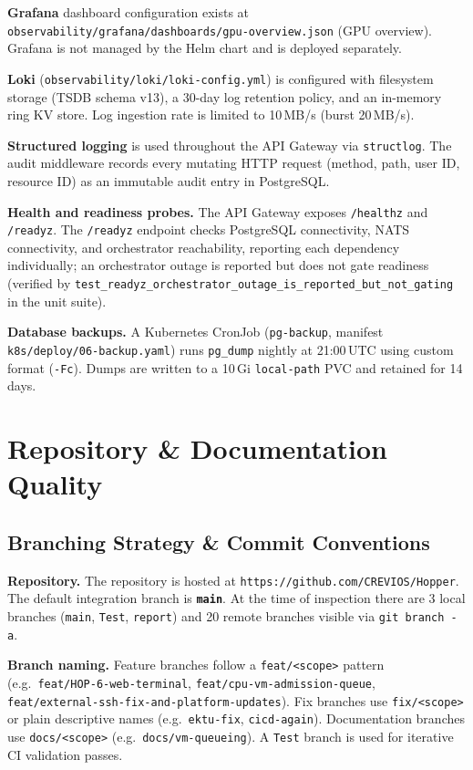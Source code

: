 \documentclass[12pt,a4paper]{article}
\begin{document}
\medskip
\noindent\textbf{Grafana} dashboard configuration exists at
\texttt{observability/grafana/dashboards/gpu-overview.json} (GPU overview).
Grafana is not managed by the Helm chart and is deployed separately.

\medskip
\noindent\textbf{Loki} (\texttt{observability/loki/loki-config.yml})
is configured with filesystem storage (TSDB schema v13), a 30-day log
retention policy, and an in-memory ring KV store.
Log ingestion rate is limited to 10\,MB/s (burst 20\,MB/s).

\medskip
\noindent\textbf{Structured logging} is used throughout the API Gateway
via \texttt{structlog}. The audit middleware records every mutating
HTTP request (method, path, user ID, resource ID) as an immutable audit
entry in PostgreSQL.

\medskip
\noindent\textbf{Health and readiness probes.}
The API Gateway exposes \texttt{/healthz} and \texttt{/readyz}.
The \texttt{/readyz} endpoint checks PostgreSQL connectivity, NATS
connectivity, and orchestrator reachability, reporting each dependency
individually; an orchestrator outage is reported but does not gate
readiness (verified by \texttt{test\_readyz\_orchestrator\_outage\_is\_reported\_but\_not\_gating}
in the unit suite).

\medskip
\noindent\textbf{Database backups.}
A Kubernetes CronJob (\texttt{pg-backup}, manifest
\texttt{k8s/deploy/06-backup.yaml}) runs \texttt{pg\_dump} nightly at
21:00\,UTC using custom format (\texttt{-Fc}). Dumps are written to a
10\,Gi \texttt{local-path} PVC and retained for 14 days.

\section{Repository \& Documentation Quality}
\subsection{Branching Strategy \& Commit Conventions}

\textbf{Repository.}
The repository is hosted at \texttt{https://github.com/CREVIOS/Hopper}.
The default integration branch is \textbf{\texttt{main}}. At the time of
inspection there are 3 local branches (\texttt{main}, \texttt{Test},
\texttt{report}) and 20 remote branches visible via \texttt{git branch -a}.

\begin{sloppypar}
\textbf{Branch naming.}
Feature branches follow a \texttt{feat/<scope>} pattern (e.g.\
\texttt{feat/HOP-6-web-terminal},
\texttt{feat/cpu-vm-admission-queue},
\texttt{feat/external-ssh-fix-and-platform-updates}).
Fix branches use \texttt{fix/<scope>} or plain descriptive names
(e.g.\ \texttt{ektu-fix}, \texttt{cicd-again}).
Documentation branches use \texttt{docs/<scope>}
(e.g.\ \texttt{docs/vm-queueing}).
A \texttt{Test} branch is used for iterative CI validation passes.
\end{sloppypar}
\end{document}

